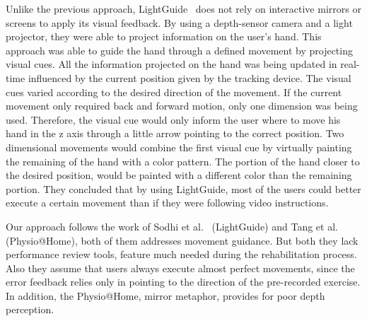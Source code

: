 Unlike the previous approach, LightGuide~\cite{Sodhi2012} does not rely on interactive mirrors or screens to apply its visual feedback. 
By using a depth-sensor camera and a light projector, they were able 
to project information on the user's hand. 
This approach was able to guide the hand through a defined 
movement by projecting visual cues. 
All the information projected on the hand was being updated in real-time influenced by the current position given by the tracking device.
The visual cues varied according to the desired direction of the movement. 
If the current movement only required back and forward motion, only one dimension was being used. 
Therefore, the visual cue would only inform the user where to move his 
hand in the z axis through a little arrow pointing to the correct position.
Two dimensional movements would combine the first visual cue by virtually painting the
remaining of the hand with a color pattern. The portion of the hand closer to the
desired position, would be painted with a different color than the remaining portion.
They concluded that by using LightGuide, most of the users could better execute a certain 
movement than if they were following video instructions.



Our approach follows the work of Sodhi et al.~\cite{Sodhi2012} (LightGuide) and Tang et al.~\cite{Tang2014a} (Physio@Home), both of them addresses movement guidance. 
But both they lack performance review tools, feature much needed during the rehabilitation process.
Also they assume that users always execute almost perfect movements, since the error feedback relies only in pointing to the direction of the pre-recorded exercise.
In addition, the Physio@Home, mirror metaphor, provides for poor depth perception.






